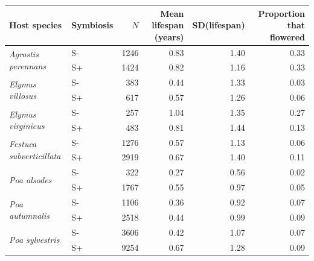 \documentclass[11pt]{article}
\begin{document}
\begin{landscape}
\newpage
\begin{table}[ht]
	\centering
	\begin{tabular}{llrrrr}
		\toprule
		Host species & Symbiosis & $N$ & Mean lifespan (years) & SD(lifespan) & Proportion that flowered \\
		\midrule
		
		\multirow{2}{*}{\textit{Agrostis perennans}}
		& S- & 1246 & 0.83 & 1.40 & 0.33 \\
		& S+ & 1424 & 0.82 & 1.16 & 0.33 \\
		\midrule
		
		\multirow{2}{*}{\textit{Elymus villosus}}
		& S- & 383 & 0.44 & 1.33 & 0.03 \\
		& S+ & 617 & 0.57 & 1.26 & 0.06 \\
		\midrule
		
		\multirow{2}{*}{\textit{Elymus virginicus}}
		& S- & 257 & 1.04 & 1.35 & 0.27 \\
		& S+ & 483 & 0.81 & 1.44 & 0.13 \\
		\midrule
		
		\multirow{2}{*}{\textit{Festuca subverticillata}}
		& S- & 1276 & 0.57 & 1.13 & 0.06 \\
		& S+ & 2919 & 0.67 & 1.40 & 0.11 \\
		\midrule
		
		\multirow{2}{*}{\textit{Poa alsodes}}
		& S- & 322 & 0.27 & 0.56 & 0.02 \\
		& S+ & 1767 & 0.55 & 0.97 & 0.05 \\
		\midrule
		
		\multirow{2}{*}{\textit{Poa autumnalis}}
		& S- & 1106 & 0.36 & 0.92 & 0.07 \\
		& S+ & 2518 & 0.44 & 0.99 & 0.09 \\
		\midrule
		
		\multirow{2}{*}{\textit{Poa sylvestris}}
		& S- & 3606 & 0.42 & 1.07 & 0.07 \\
		& S+ & 9254 & 0.67 & 1.28 & 0.09 \\
		
		\bottomrule
	\end{tabular}
\end{table}

\end{landscape}	
\end{document}
